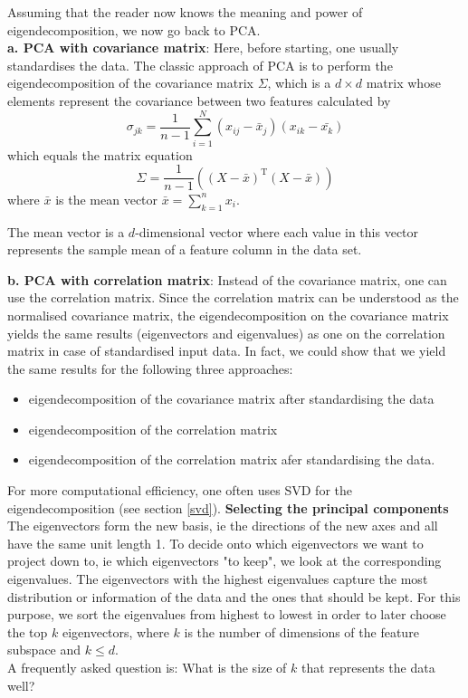 \documentclass[journal, a4paper]{IEEEtran}
\begin{document}
Assuming that the reader now knows the meaning and power of eigendecomposition, we now go back to PCA.\\
\textbf{a. PCA with covariance matrix}:
Here, before starting, one usually standardises the data. %
The classic approach of PCA is to perform the eigendecomposition of the covariance matrix \( \Sigma \), which is a \( d \times d \) matrix whose elements represent the covariance between two features calculated by 
\[
\sigma_{jk} = \frac{1}{n-1} \sum_{i=1}^{N} (x_{ij} - \bar{x}_{j}) (x_{ik} - \bar{x_{k}})
\]
which equals the matrix equation
\[
\Sigma = \frac{1}{n-1} ( (X - \bar{x})^{\text{T}} (X - \bar{x}) )
\]
where \( \bar{x }\) is the mean vector \( \bar{x}= \sum_{k=1}^{n} x_{i}  \).

The mean vector is a \(d\)-dimensional vector where each value in this vector represents the sample mean of a feature column in the data set.

\textbf{b. PCA with correlation matrix}: 
Instead of the covariance matrix, one can use the correlation matrix. 
Since the correlation matrix can be understood as the normalised covariance matrix, the eigendecomposition on the covariance matrix yields the same results (eigenvectors and eigenvalues) as one on the correlation matrix in case of standardised input data. 
In fact, we could show that we yield the same results for the following three approaches:
\begin{itemize}
\item eigendecomposition of the covariance matrix after standardising the data
\item eigendecomposition of the correlation matrix
\item eigendecomposition of the correlation matrix afer standardising the data.
\end{itemize}
For more computational efficiency, one often uses SVD for the eigendecomposition (see section \ref{svd}).
\newline
\textbf{Selecting the principal components}\\
The eigenvectors form the new basis, ie the directions of the new axes and all have the same unit length 1. To decide onto which eigenvectors we want to project down to, ie which eigenvectors "to keep", we look at the corresponding eigenvalues. The eigenvectors with the highest eigenvalues capture the most distribution or information of the data and the ones that should be kept. 
For this purpose, we sort the eigenvalues from highest to lowest in order to later choose the top \( k \) eigenvectors, where \( k \) is the number of dimensions of the feature subspace and \( k \leq d \). \\
A frequently asked question is: What is the size of \( k \) that represents the data well?
\end{document}
